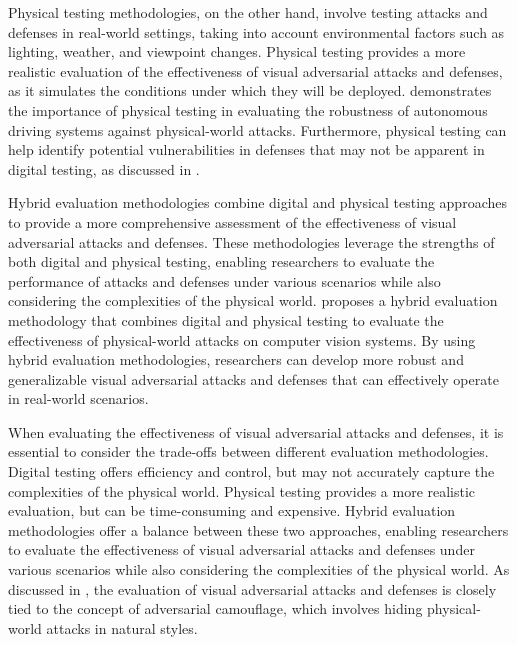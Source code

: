\documentclass[11pt,a4paper]{article}
\begin{document}
Physical testing methodologies, on the other hand, involve testing attacks and defenses in real-world settings, taking into account environmental factors such as lighting, weather, and viewpoint changes. Physical testing provides a more realistic evaluation of the effectiveness of visual adversarial attacks and defenses, as it simulates the conditions under which they will be deployed. \cite{doi:10.1109/cvpr42600.2020.01426} demonstrates the importance of physical testing in evaluating the robustness of autonomous driving systems against physical-world attacks. Furthermore, physical testing can help identify potential vulnerabilities in defenses that may not be apparent in digital testing, as discussed in \cite{doi:10.1109/cvpr42600.2020.00108}.

Hybrid evaluation methodologies combine digital and physical testing approaches to provide a more comprehensive assessment of the effectiveness of visual adversarial attacks and defenses. These methodologies leverage the strengths of both digital and physical testing, enabling researchers to evaluate the performance of attacks and defenses under various scenarios while also considering the complexities of the physical world. \cite{doi:10.1109/eurosp53844.2022.00047} proposes a hybrid evaluation methodology that combines digital and physical testing to evaluate the effectiveness of physical-world attacks on computer vision systems. By using hybrid evaluation methodologies, researchers can develop more robust and generalizable visual adversarial attacks and defenses that can effectively operate in real-world scenarios.

When evaluating the effectiveness of visual adversarial attacks and defenses, it is essential to consider the trade-offs between different evaluation methodologies. Digital testing offers efficiency and control, but may not accurately capture the complexities of the physical world. Physical testing provides a more realistic evaluation, but can be time-consuming and expensive. Hybrid evaluation methodologies offer a balance between these two approaches, enabling researchers to evaluate the effectiveness of visual adversarial attacks and defenses under various scenarios while also considering the complexities of the physical world. As discussed in \cite{doi:10.1109/satml54575.2023.00030}, the evaluation of visual adversarial attacks and defenses is closely tied to the concept of adversarial camouflage, which involves hiding physical-world attacks in natural styles.
\end{document}
